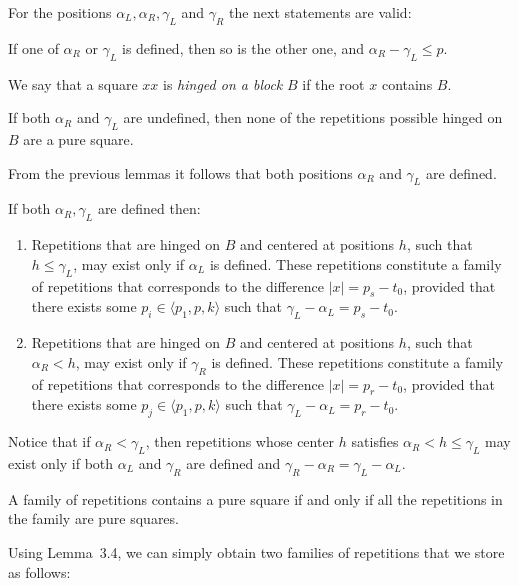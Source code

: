 \documentclass[11pt]{article}
\begin{document}
For the positions $\alpha_L, \alpha_R, \gamma_L$ and $\gamma_R$ the next statements are valid:

\begin{lem}[{\rm\cite{2}}]
If one of $\alpha_R$ or $\gamma_L$ is defined, then so is the
other one, and $\alpha_R - \gamma_L \leq p$.
\end{lem}

We say that a square $xx$ is \emph{hinged on a block} $B$
if the root $x$ contains $B$.

\begin{lem}[{\rm\cite{2}}]
If both $\alpha_R$ and $\gamma_L$ are undefined, then none of the
repetitions possible hinged on $B$ are a pure square.
\end{lem}

From the previous lemmas it follows that both positions $\alpha_R$ and $\gamma_L$ are defined.

\begin{lem}[{\rm\cite{2}}]
If both $\alpha_R, \gamma_L$ are defined then:

\begin{enumerate}
\item Repetitions that are hinged on $B$ and centered at positions $h$, such that $h \leq \gamma_L$, may exist only if
$\alpha_L$ is defined. These repetitions constitute a family of
repetitions that corresponds to the difference $|x| = p_s - t_0$,
provided that there exists some $p_i \in \langle p_1, p, k\rangle$
such that $\gamma_L - \alpha_L = p_s - t_0$.
\item Repetitions that are hinged on $B$ and centered at positions $h$, such that $\alpha_R < h$, may exist only if
$\gamma_R$ is defined. These repetitions constitute a family of
repetitions that corresponds to the difference $|x| = p_r - t_0$,
provided that there exists some $p_j \in \langle p_1, p, k\rangle$
such that $\gamma_L - \alpha_L = p_r - t_0$.
\end{enumerate}
\end{lem}
Notice that if $\alpha_R < \gamma_L$, then repetitions whose center $h$ satisfies $\alpha_R < h \leq\gamma_L$ may
exist only if both $\alpha_L$ and $\gamma_R$ are defined and $\gamma_R - \alpha_R = \gamma_L - \alpha_L$.


\begin{lem}[{\rm\cite{2}}]
A family of repetitions contains a pure square if and only if all the repetitions in the family are pure squares.
\end{lem}

Using Lemma~3.4, we can simply obtain two families of repetitions that we store as follows:
\end{document}
